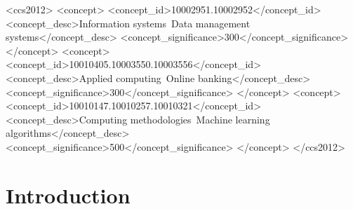 \documentclass[sigconf]{acmart}
\begin{document}
\begin{CCSXML}
<ccs2012>
   <concept>
       <concept_id>10002951.10002952</concept_id>
       <concept_desc>Information systems~Data management systems</concept_desc>
       <concept_significance>300</concept_significance>
       </concept>
   <concept>
       <concept_id>10010405.10003550.10003556</concept_id>
       <concept_desc>Applied computing~Online banking</concept_desc>
       <concept_significance>300</concept_significance>
       </concept>
   <concept>
       <concept_id>10010147.10010257.10010321</concept_id>
       <concept_desc>Computing methodologies~Machine learning algorithms</concept_desc>
       <concept_significance>500</concept_significance>
       </concept>
 </ccs2012>
\end{CCSXML}



\maketitle

\section{Introduction} \label{sec-intro}

\end{document}
